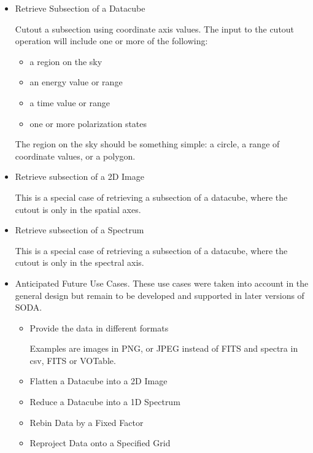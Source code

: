 \documentclass[11pt,a4paper]{ivoa}
\begin{document}
\begin{itemize}
\item{Retrieve Subsection of a Datacube}
\label{sec:use-cube}

Cutout a subsection using coordinate axis values. The input to the
cutout operation will include one or more of the following:

\begin{itemize}
\item a region on the sky
\item an energy value or range
\item a time value or range
\item one or more polarization states
\end{itemize}

The region on the sky should be something simple: a circle,
a range of coordinate values, or a polygon.

\item{Retrieve subsection of a 2D Image}

This is a special case of retrieving a subsection of a datacube,
where the cutout is only in the spatial axes.

\item{Retrieve subsection of a Spectrum}

This is a special case of retrieving a subsection of a datacube,
where the cutout is only in the spectral axis.

\item{Anticipated Future Use Cases. These use cases were taken into
account in the general design but remain to be developed and supported
in later versions of SODA.}

\begin{itemize}

\item{Provide the data in different formats}

Examples are images in PNG, or JPEG instead of FITS and spectra in csv,
FITS or VOTable.     

\item{Flatten a Datacube into a 2D Image}

\item{Reduce a Datacube into a 1D Spectrum}



\item{Rebin Data by a Fixed Factor}



\item{Reproject Data onto a Specified Grid}



\end{itemize}
\end{itemize}
\end{document}
